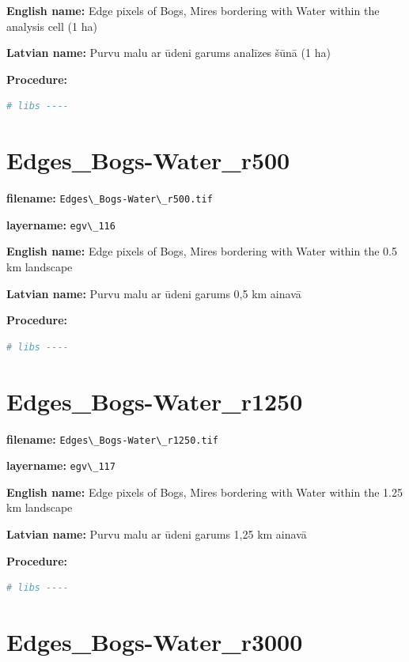 \documentclass[
]{book}
\newcommand{\passthrough}[1]{#1}
\begin{document}
\textbf{English name:} Edge pixels of Bogs, Mires bordering with Water within the analysis cell (1 ha)

\textbf{Latvian name:} Purvu malu ar ūdeni garums analīzes šūnā (1 ha)

\textbf{Procedure:}

\begin{lstlisting}[language=R]
# libs ----
\end{lstlisting}

\section{Edges\_Bogs-Water\_r500}\label{ch06.116}

\textbf{filename:} \passthrough{\lstinline!Edges\_Bogs-Water\_r500.tif!}

\textbf{layername:} \passthrough{\lstinline!egv\_116!}

\textbf{English name:} Edge pixels of Bogs, Mires bordering with Water within the 0.5 km landscape

\textbf{Latvian name:} Purvu malu ar ūdeni garums 0,5 km ainavā

\textbf{Procedure:}

\begin{lstlisting}[language=R]
# libs ----
\end{lstlisting}

\section{Edges\_Bogs-Water\_r1250}\label{ch06.117}

\textbf{filename:} \passthrough{\lstinline!Edges\_Bogs-Water\_r1250.tif!}

\textbf{layername:} \passthrough{\lstinline!egv\_117!}

\textbf{English name:} Edge pixels of Bogs, Mires bordering with Water within the 1.25 km landscape

\textbf{Latvian name:} Purvu malu ar ūdeni garums 1,25 km ainavā

\textbf{Procedure:}

\begin{lstlisting}[language=R]
# libs ----
\end{lstlisting}

\section{Edges\_Bogs-Water\_r3000}\label{ch06.118}
\end{document}
